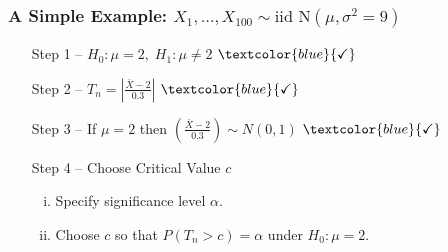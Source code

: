 \begin{frame}
  \frametitle{A Simple Example: $X_1, \dots, X_{100}\sim \mbox{iid N}(\mu, \sigma^2 = 9)$}
  \begin{enumerate}
    \item[Step 1] -- $H_0\colon \mu = 2, \; H_1\colon \mu \neq 2$ $\textcolor{blue}{\checkmark}$
    \item[Step 2] -- $T_n = \displaystyle \left|\frac{\bar{X} - 2}{0.3} \right|$ $\textcolor{blue}{\checkmark}$
    \item[Step 3] -- If $\mu = 2$ then $\displaystyle \left(\frac{\bar{X} - 2}{0.3}\right) \sim N(0,1)$ $\textcolor{blue}{\checkmark}$
    \item[Step 4] -- \alert{Choose Critical Value $c$}
      \begin{enumerate}[(i)]
        \item Specify significance level $\alpha$.
        \item Choose $c$ so that $P(T_n > c)=\alpha$ under $H_0\colon \mu = 2$.
      \end{enumerate}
  \end{enumerate}
\end{frame}

